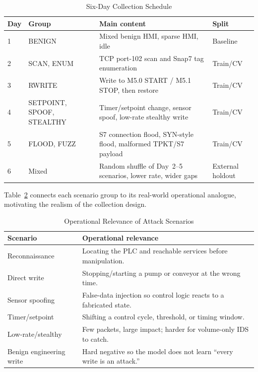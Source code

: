 \documentclass[conference]{IEEEtran}
\begin{document}
\begin{table}[t]
\centering
\caption{Six-Day Collection Schedule}
\label{tab:days}
\begin{tabular}{p{0.5cm}p{1.6cm}p{3.6cm}p{1.1cm}}
\toprule
\textbf{Day} & \textbf{Group} & \textbf{Main content} & \textbf{Split} \\
\midrule
1 & BENIGN & Mixed benign HMI, sparse HMI, idle & Baseline \\
2 & SCAN, ENUM & TCP port-102 scan and Snap7 tag enumeration & Train/CV \\
3 & RWRITE & Write to M5.0 START / M5.1 STOP, then restore & Train/CV \\
4 & SETPOINT, SPOOF, STEALTHY & Timer/setpoint change, sensor spoof, low-rate stealthy write & Train/CV \\
5 & FLOOD, FUZZ & S7 connection flood, SYN-style flood, malformed TPKT/S7 payload & Train/CV \\
6 & Mixed & Random shuffle of Day~2--5 scenarios, lower rate, wider gaps & External holdout \\
\bottomrule
\end{tabular}
\end{table}

Table~\ref{tab:scenarios} connects each scenario group to its real-world operational analogue, motivating the realism of the collection design.

\begin{table}[t]
\centering
\caption{Operational Relevance of Attack Scenarios}
\label{tab:scenarios}
\begin{tabular}{p{1.7cm}p{5.8cm}}
\toprule
\textbf{Scenario} & \textbf{Operational relevance} \\
\midrule
Reconnaissance & Locating the PLC and reachable services before manipulation. \\
Direct write & Stopping/starting a pump or conveyor at the wrong time. \\
Sensor spoofing & False-data injection so control logic reacts to a fabricated state. \\
Timer/setpoint & Shifting a control cycle, threshold, or timing window. \\
Low-rate/stealthy & Few packets, large impact; harder for volume-only IDS to catch. \\
Benign engineering write & Hard negative so the model does not learn ``every write is an attack.'' \\
\bottomrule
\end{tabular}
\end{table}
\end{document}
